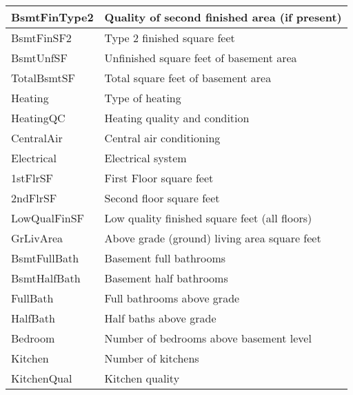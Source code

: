 \begin{table}[H]
\begin{longtable}{|l|l|}
        \hline
        BsmtFinType2  & Quality of second finished area (if present)                \\
        \hline
        BsmtFinSF2    & Type 2 finished square feet                                 \\
        \hline
        BsmtUnfSF     & Unfinished square feet of basement area                     \\
        \hline
        TotalBsmtSF   & Total square feet of basement area                          \\
        \hline
        Heating       & Type of heating                                             \\
        \hline
        HeatingQC     & Heating quality and condition                               \\
        \hline
        CentralAir    & Central air conditioning                                    \\
        \hline
        Electrical    & Electrical system                                           \\
        \hline
        1stFlrSF      & First Floor square feet                                     \\
        \hline
        2ndFlrSF      & Second floor square feet                                    \\
        \hline
        LowQualFinSF  & Low quality finished square feet (all floors)               \\
        \hline
        GrLivArea     & Above grade (ground) living area square feet                \\
        \hline
        BsmtFullBath  & Basement full bathrooms                                     \\
        \hline
        BsmtHalfBath  & Basement half bathrooms                                     \\
        \hline
        FullBath      & Full bathrooms above grade                                  \\
        \hline
        HalfBath      & Half baths above grade                                      \\
        \hline
        Bedroom       & Number of bedrooms above basement level                     \\
        \hline
        Kitchen       & Number of kitchens                                          \\
        \hline
        KitchenQual   & Kitchen quality                                             \\

\end{longtable}
\end{table}
